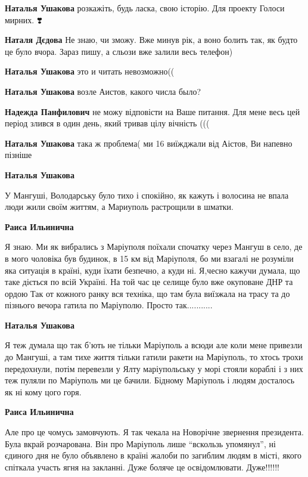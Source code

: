 \begin{itemize} %
\textbf{Наталья Ушакова} розкажіть, будь ласка, свою історію. Для проекту Голоси мирних. ❣️

\textbf{Наталя Дєдова} Не знаю, чи зможу. Вже минув рік, а воно болить так, як будто це було вчора. Зараз пишу, а сльози вже залили весь телефон)

\textbf{Наталья Ушакова} это и читать невозможно((

\textbf{Наталья Ушакова} возле Аистов, какого числа было?

\textbf{Надежда Панфилович} не можу відповісти на Ваше питання. Для мене весь цей період злився в один день, який тривав цілу вічність (((

\textbf{Наталья Ушакова} така ж проблема( ми 16 виїжджали від Аістов, Ви напевно пізніше

\textbf{Наталья Ушакова} 

У Мангуші, Володарську було тихо і спокійно, як кажуть і волосина не впала люди
жили своїм життям, а Мариуполь растрощили в шматки.

\textbf{Раиса Ильинична} 

Я знаю. Ми як вибрались з Маріуполя поїхали спочатку через Мангуш в село, де в
мого чоловіка був будинок, в 15 км від Маріуполя, бо ми взагалі не розуміли яка
ситуація в країні, куди їхати безпечно, а куди ні. Я,чесно кажучи думала, що
таке діється по всій Україні. На той час це селище було вже окуповане ДНР та
ордою Так от кожного ранку вся техніка, що там була виїзжала на трасу та до
пізнього вечора гатила по Маріуполю. Просто так...........

\textbf{Наталья Ушакова} 

Я теж думала що так б'ють не тільки Маріуполь а всюди але коли мене привезли до
Мангуші, а там тихе життя тільки гатили ракети на Маріуполь, то хтось трохи
передохнули, потім перевезли у Ялту маріупольську у морі стояли кораблі і з них
теж пуляли по Маріуполь ми це бачили. Бідному Маріуполь і людям досталось як ні
кому цого горя.

\textbf{Раиса Ильинична} 

Але про це чомусь замовчують. Я так чекала на Новорічне звернення президента.
Була вкрай розчарована. Він про Маріуполь лише \enquote{вскользь упомянул}, ні єдиного
дня не було объявлено в країні жалоби по загиблим людям в місті, якого спіткала
участь ягня на закланні. Дуже боляче це освідомлювати. Дуже!!!!!!


\end{itemize}
